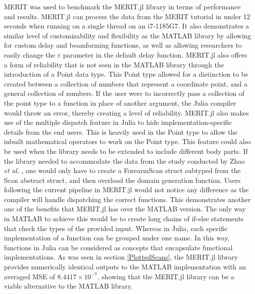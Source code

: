 MERIT was used to benchmark the MERIT.jl library in terms of performance and results. MERIT.jl can process the data from
the MERIT tutorial in under 12 seconds when running on a single thread on an i7-1185G7. It also demonstrates a
similar level of customizability and flexibility as the MATLAB library by allowing for custom delay and beamforming
functions, as well as allowing researchers to easily change the $\varepsilon$ parameter in the default delay function.
MERIT.jl also offers a form of reliability that is not seen in the MATLAB library through the introduction of a Point
data type. This Point type allowed for a distinction to be created between a collection of numbers that represent a
coordinate point, and a general collection of numbers. If the user were to incorrectly pass a collection of the point
type to a function in place of another argument, the Julia compiler would throw an error, thereby creating a level of
reliability. MERIT.jl also makes use of the multiple dispatch feature in Julia to hide implementation-specific details
from the end users. This is heavily used in the Point type to allow the inbuilt mathematical operators to work on the
Point type. This feature could also be used when the library needs to be extended to include different body parts. If
the library needed to accommodate the data from the study conducted by Zhao \textit{et al.}
\cite{gilmoreMicrowaveImagingHuman2013}, one would only have to create a ForearmScan struct subtyped from the Scan
abstract struct, and then overload the domain generation function. Users following the current pipeline in MERIT.jl
would not notice any difference as the compiler will handle dispatching the correct functions. This demonstrates another
one of the benefits that MERIT.jl has over the MATLAB version. The only way in MATLAB to achieve this would be to create
long chains of if-else statements that check the types of the provided input. Whereas in Julia, each specific
implementation of a function can be grouped under one name. In this way, functions in Julia can be considered as
concepts that encapsulate functional implementations. As was seen in section \ref{PlottedScans}, the MERIT.jl library
provides numerically identical outputs to the MATLAB implementation with an averaged MSE of $8.4417 \times 10^{-7}$,
showing that the MERIT.jl library can be a viable alternative to the MATLAB library.

